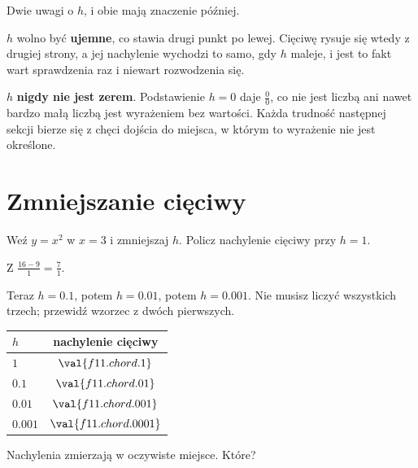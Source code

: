 \begin{fr}
Dwie uwagi o $h$, i obie mają znaczenie później.

$h$ wolno być \textbf{ujemne}, co stawia drugi punkt po lewej. Cięciwę rysuje
się wtedy z drugiej strony, a jej nachylenie wychodzi to samo, gdy $h$ maleje,
i jest to fakt wart sprawdzenia raz i niewart rozwodzenia się.

$h$ \textbf{nigdy nie jest zerem}. Podstawienie $h = 0$ daje
$\frac{0}{0}$, co nie jest liczbą ani nawet bardzo małą liczbą \dash{} jest
wyrażeniem bez wartości. Każda trudność następnej sekcji bierze się z chęci
dojścia do miejsca, w którym to wyrażenie nie jest określone.
\end{fr}

\section{Zmniejszanie cięciwy}
\label{sec:F11-shrinking}

\begin{fr}
Weź $y = x^{2}$ w $x = 3$ i zmniejszaj $h$. Policz nachylenie cięciwy przy
$h = 1$.
\nextframe
\end{fr}

\begin{fr}
Z $\frac{16 - 9}{1} = \frac{7}{1}$.

Teraz $h = \num{0.1}$, potem $h = \num{0.01}$, potem $h = \num{0.001}$. Nie
musisz liczyć wszystkich trzech; przewidź wzorzec z dwóch pierwszych.
\dotline
\nextframe
\end{fr}

\begin{fr}
\begin{ansblock}
\begin{center}
\begin{tabular}{lc}
\toprule
$h$ & nachylenie cięciwy \\
\midrule
$1$ & $\val{f11.chord.1}$ \\
$\num{0.1}$ & $\val{f11.chord.01}$ \\
$\num{0.01}$ & $\val{f11.chord.001}$ \\
$\num{0.001}$ & $\val{f11.chord.0001}$ \\
\bottomrule
\end{tabular}
\end{center}
\end{ansblock}

Nachylenia zmierzają w oczywiste miejsce. Które?
\nextframe
\end{fr}

